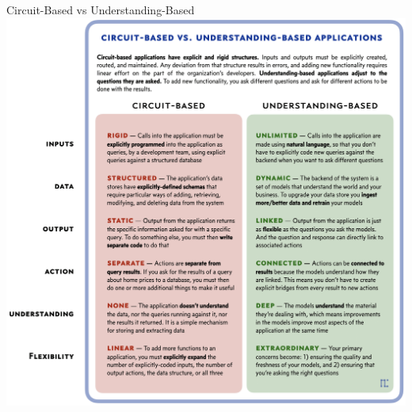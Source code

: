 \documentclass{beamer}
\begin{document}
\begin{frame}{Circuit-Based vs Understanding-Based}
  \centering
  \includegraphics[width=\linewidth,height=0.8\textheight,keepaspectratio]{./images/spqa-1-circuit-vs-understanding.png}
\end{frame}
\end{document}
